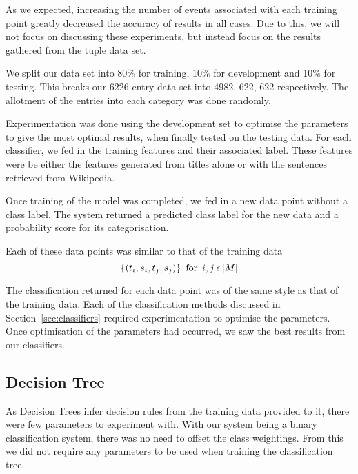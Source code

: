 \documentclass[bsc,frontabs,twoside,singlespacing,parskip,deptreport]{infthesis}     %
\begin{document}
As we expected, increasing the number of events associated with each training point greatly decreased the accuracy of results in all cases.
Due to this, we will not focus on discussing these experiments, but instead focus on the results gathered from the tuple data set.

We split our data set into 80\% for training, 10\% for development and 10\% for testing.
This breaks our 6226 entry data set into 4982, 622, 622 respectively.
The allotment of the entries into each category was done randomly.

Experimentation was done using the development set to optimise the parameters to give the most optimal results,
when finally tested on the testing data.
For each classifier, we fed in the training features and their associated label. These features were
be either the features generated from titles alone or with the sentences retrieved from Wikipedia.

Once training of the model was completed, we fed in a new data point without a class label.
The system returned a predicted class label for the new data and a probability score for its categorisation.

Each of these data points was similar to that of the training data
 \begin{equation}
   \{(t_{i},s_{i},t_{j},s_{j})\} \hspace{0.5em} \text{for} \hspace{0.5em} i,j \hspace{0.2em}\epsilon \hspace{0.2em}[M]\nonumber
 \end{equation}

 The classification returned for each data point was of the same style as that of the training data.
 Each of the classification methods discussed in Section~\ref{sec:classifiers} required experimentation to optimise the
 parameters. Once optimisation of the parameters had occurred, we saw the best results from our classifiers.

 \subsection{Decision Tree}
 As Decision Trees infer decision rules from the training data provided to it, there were few parameters to
 experiment with. With our system being a binary classification system, there was no need to offset the class weightings.
 From this we did not require any parameters to be used when training the classification tree.
 
\end{document}
